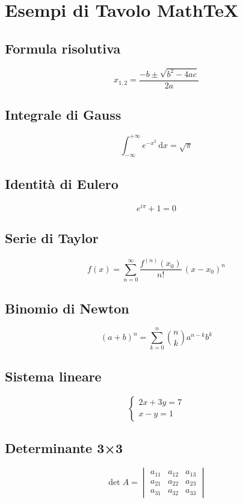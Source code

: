 \documentclass[a4paper,11pt]{article}
\begin{document}
\section*{Esempi di Tavolo MathTeX}

\subsection*{Formula risolutiva}
\[
x_{1,2} = \frac{-b \pm \sqrt{b^2 - 4ac}}{2a}
\]

\subsection*{Integrale di Gauss}
\[
\int_{-\infty}^{+\infty} e^{-x^2}\,\mathrm{d}x = \sqrt{\pi}
\]

\subsection*{Identità di Eulero}
\[
e^{i\pi} + 1 = 0
\]

\subsection*{Serie di Taylor}
\[
f(x) = \sum_{n=0}^{\infty} \frac{f^{(n)}(x_0)}{n!}\,(x - x_0)^n
\]

\subsection*{Binomio di Newton}
\[
(a+b)^n = \sum_{k=0}^{n} \binom{n}{k} a^{n-k} b^{k}
\]

\subsection*{Sistema lineare}
\[
\begin{cases}
  2x + 3y = 7 \\
  x - y = 1
\end{cases}
\]

\subsection*{Determinante 3×3}
\[
\det A =
\begin{vmatrix}
  a_{11} & a_{12} & a_{13} \\
  a_{21} & a_{22} & a_{23} \\
  a_{31} & a_{32} & a_{33}
\end{vmatrix}
\]
\end{document}
